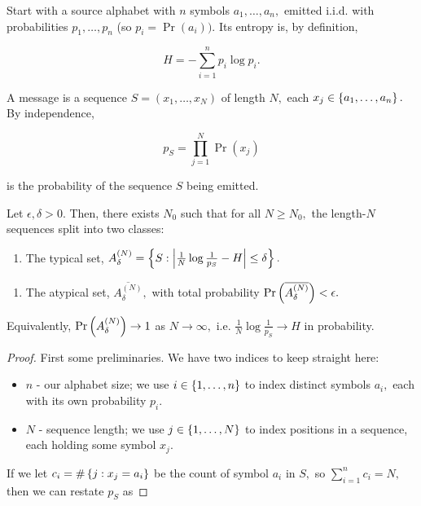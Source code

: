 \documentclass{article}
\begin{document}
\begin{theorem}
	Start with a source alphabet with $n$ symbols $a_1, \dots, a_n,$ emitted \@{i.i.d.} with probabilities $p_1, \dots, p_n$ (so $p_i = \Pr(a_i)).$ Its \@{entropy} is, by definition,

\[ H = - \sum_{i=1}^{n} p_i \log{p_i}. \]

A message is a \@{sequence} $S = (x_1, \dots, x_N)$ of length $N,$ each $x_j \in \left\{ a_1, \dots, a_n \right\}.$ By independence,

\[ p_S = \prod_{j=1}^N \Pr(x_j) \]

is the probability of the sequence $S$ being emitted.


Let $\epsilon, \delta > 0.$ Then, there exists $N_0$ such that for all $N \geq N_0,$ the length-$N$ sequences split into two classes:

\begin{enumerate}
\item The typical set, $A_\delta^{(N)} = \left\{ S : \left| \frac{1}{N} \log{\frac{1}{p_S}} - H \right| \leq \delta \right\}.$
\end{enumerate}

\begin{enumerate}
\item The atypical set, $\overline{A_\delta^{(N)}},$ with total probability $\Pr \left(\overline{A_\delta^{(N)}}\right) < \epsilon.$
\end{enumerate}

Equivalently, $\Pr \left(A_\delta^{(N)}\right) \to 1$ as $N \to \infty,$ i.e. $\frac{1}{N} \log{\frac{1}{p_S}} \to H$ in probability. 

\begin{proof}

First some preliminaries. We have two indices to keep straight here:

\begin{itemize}
\item $n$ - our alphabet size; we use $i \in \left\{ 1, \dots, n \right\}$ to index distinct symbols $a_i,$ each with its own probability $p_i.$
\end{itemize}

\begin{itemize}
\item $N$ - sequence length; we use $j \in \left\{ 1, \dots, N \right\}$ to index positions in a sequence, each holding some symbol $x_j.$
\end{itemize}

If we let $c_i = \#\left\{ j : x_j = a_i \right\}$ be the count of symbol $a_i$ in $S,$ so $\sum_{i=1}^n c_i = N,$ then we can restate $p_S$ as


\end{proof}
\end{theorem}
\end{document}

